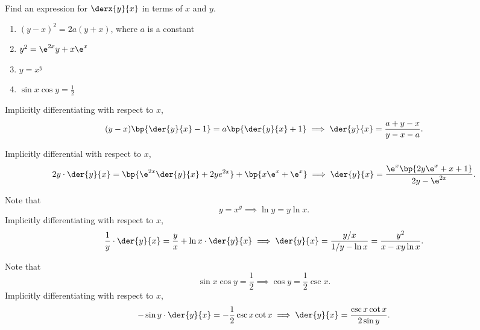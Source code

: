 \begin{problem}
    Find an expression for $\derx{y}{x}$ in terms of $x$ and $y$.
        
    \begin{enumerate}
        \item $(y-x)^2 = 2a(y+x)$, where $a$ is a constant
        \item $y^2 = \e^{2x}y + x\e^x$
        \item $y = x^y$
        \item $\sin x \cos y = \frac12$
    \end{enumerate}
\end{problem}
\begin{solution}
    \begin{ppart}
        Implicitly differentiating with respect to $x$, \[(y-x)\bp{\der{y}{x} - 1} = a\bp{\der{y}{x} + 1} \implies \der{y}{x} = \frac{a + y - x}{y - x - a}.\]
    \end{ppart}
    \begin{ppart}
        Implicitly differential with respect to $x$, \[2y \cdot \der{y}{x} = \bp{\e^{2x} \der{y}{x} + 2ye^{2x}} + \bp{x\e^x + \e^x} \implies \der{y}{x} = \frac{\e^x \bp{2y\e^x + x + 1}}{2y - \e^{2x}}.\]
    \end{ppart}
    \begin{ppart}
        Note that \[y = x^y \implies \ln y = y \ln x.\] Implicitly differentiating with respect to $x$, \[\frac1y \cdot \der{y}{x} = \frac{y}{x} + \ln x \cdot \der{y}{x} \implies \der{y}{x} = \frac{y/x}{1/y - \ln x} = \frac{y^2}{x - xy \ln x}.\]
    \end{ppart}
    \begin{ppart}
        Note that \[\sin x \cos y  = \frac12 \implies \cos y = \frac12 \csc x.\] Implicitly differentiating with respect to $x$, \[-\sin y \cdot \der{y}{x} = -\frac12 \csc x \cot x \implies \der{y}{x} = \frac{\csc x \cot x}{2\sin y}.\]
    \end{ppart}
\end{solution}

